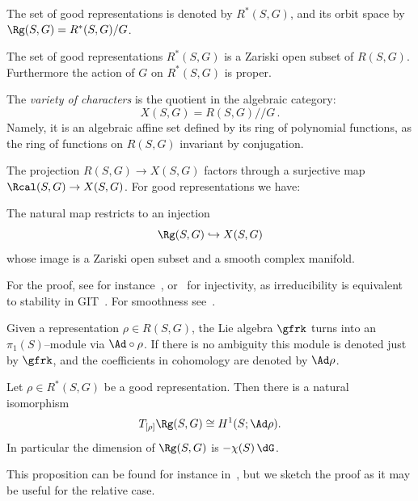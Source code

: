 The set of good representations is denoted by $R^*(S,G)$, and its orbit space by $\Rg(S,G) = R^*(S,G)/G$.



\begin{prop}
The set of good representations $R^*(S,G)$ is a Zariski open subset of $R(S,G)$. Furthermore the action of $G$ on $R^*(S,G)$ is proper.
\end{prop}



The \emph{variety of characters} is the quotient in the algebraic category:
\[
X(S,G)=R(S,G)/\!\!/ G\,.
\]
Namely, it is an algebraic affine set defined by its ring of polynomial functions, as the ring of functions on $R(S,G)$ invariant by conjugation.

The projection $R(S,G)\to X(S,G)$ factors through a surjective map $\Rcal(S,G)\to X(S,G)$. For good representations we have:

\begin{prop}\label{Prop:smoothvariety}
The natural map restricts to an injection
\[
\Rg(S,G)\hookrightarrow X(S,G)
\]
whose image is a Zariski open subset and a smooth complex manifold.
\end{prop}

For the proof, see for instance~\cite[Section~1]{JohnsonMillson}, or~\cite[Proposition~3.8]{Newstead} for injectivity, as irreducibility is equivalent to stability in GIT~\cite[Section~1]{JohnsonMillson}. For smoothness see~\cite{GoldmanAdvances}.


Given a representation $\rho\in R(S,G)$, the Lie algebra $\gfrk$ turns into an $\pi_1(S)$--module via $\Ad\circ \rho$. If there is no ambiguity this module is denoted just by $\gfrk$, and the coefficients in cohomology are denoted by $\Ad\rho$.

\begin{prop}\label{Prop:tangentspace}
Let $\rho\in R^*(S,G)$ be a good representation. Then there is a natural isomorphism
\[
T_{[\rho]}\Rg(S,G)\cong H^1(S;\Ad\rho).
\]
In particular the dimension of $\Rg(S,G)$ is $-\chi(S)\, \dG$.
\end{prop}


This proposition can be found for instance in~\cite[Corollary~50]{Sikora12}, but we sketch the proof as it may be useful for the relative case.

